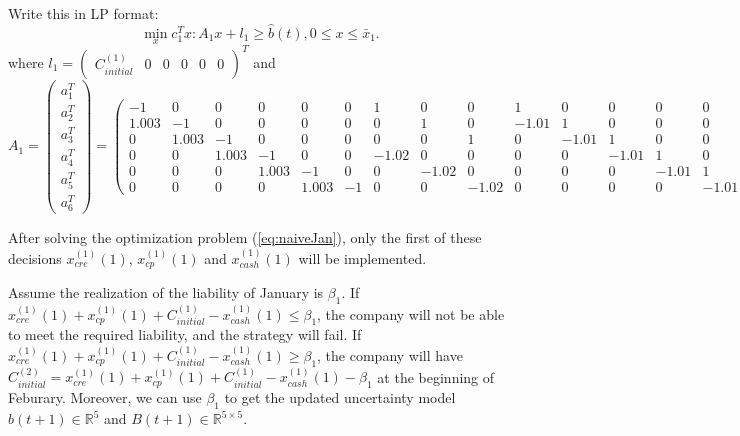 \documentclass[14pt]{article}
\begin{document}
    Write this in LP format:
    \begin{equation}\label{eq:naiveJan}
        \min_x c_1^Tx: A_1x+l_1\geq\hat{b}(t), 0\leq x\leq \bar{x}_1.
    \end{equation}
    where $l_1 = \begin{pmatrix}C^{(1)}_{initial} & 0& 0& 0& 0& 0\end{pmatrix}^T$ and 
    \[
        A_1
        = 
        \begin{pmatrix}
            a_1^T \\
            a_2^T \\
            a_3^T \\
            a_4^T \\
            a_5^T \\
            a_6^T
        \end{pmatrix}
        =
        \begin{pmatrix}
            -1    &   0    &   0    &  0    &  0    &  0    &  1    &  0   &  0   &  1     &   0   &  0   &  0   &  0   \\
            1.003 &  -1    &   0    &  0    &  0    &  0    &  0    &  1   &  0   &  -1.01 &   1   &  0   &  0   &  0   \\
            0     & 1.003  &   -1   &  0    &  0    &  0    &  0    &  0   &  1   &  0     & -1.01 &  1   &  0   &  0   \\
            0     &  0     & 1.003  &   -1  &  0    &  0    & -1.02 &  0   &  0   &  0     &  0    & -1.01&  1   &  0   \\
            0     &  0     &  0     & 1.003 &  -1   &  0    &  0    &-1.02 &  0   &  0     &  0    &  0   &-1.01 &  1   \\
            0     &  0     &  0     &  0    & 1.003 &  -1   &  0    &  0   &-1.02 &  0     &  0    &  0   &  0   &-1.01
        \end{pmatrix}.
    \]

    After solving the optimization problem (\ref{eq:naiveJan}), only the first of these decisions $x^{(1)}_{cre}(1)$, $x^{(1)}_{cp}(1)$ and $x^{(1)}_{cash}(1)$ will be implemented. 

    Assume the realization of the liability of January is $\beta_1$. If $x^{(1)}_{cre}(1)+x^{(1)}_{cp}(1)+C^{(1)}_{initial} - x^{(1)}_{cash}(1) \leq \beta_1$, the company will not be able to meet the required liability, and the strategy will fail. If $x^{(1)}_{cre}(1)+x^{(1)}_{cp}(1)+C^{(1)}_{initial} - x^{(1)}_{cash}(1) \geq \beta_1$, the company will have $C^{(2)}_{initial} =  x^{(1)}_{cre}(1)+x^{(1)}_{cp}(1)+C^{(1)}_{initial} - x^{(1)}_{cash}(1) - \beta_1$ at the beginning of Feburary. Moreover, we can use $\beta_1$ to get the updated uncertainty model $\hat{b}(t+1)\in\mathbb{R}^5$ and $B(t+1)\in\mathbb{R}^{5\times5}$.
\end{document}
